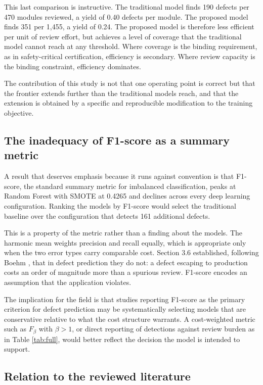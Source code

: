 \documentclass[12pt,a4paper,oneside]{report}
\begin{document}
This last comparison is instructive. The traditional model finds 190 defects per 470 modules reviewed, a yield of 0.40 defects per module. The proposed model finds 351 per 1,455, a yield of 0.24. The proposed model is therefore less efficient per unit of review effort, but achieves a level of coverage that the traditional model cannot reach at any threshold. Where coverage is the binding requirement, as in safety-critical certification, efficiency is secondary. Where review capacity is the binding constraint, efficiency dominates.

The contribution of this study is not that one operating point is correct but that the frontier extends further than the traditional models reach, and that the extension is obtained by a specific and reproducible modification to the training objective.

\subsection{The inadequacy of F1-score as a summary metric}

A result that deserves emphasis because it runs against convention is that F1-score, the standard summary metric for imbalanced classification, peaks at Random Forest with SMOTE at 0.4265 and declines across every deep learning configuration. Ranking the models by F1-score would select the traditional baseline over the configuration that detects 161 additional defects.

This is a property of the metric rather than a finding about the models. The harmonic mean weights precision and recall equally, which is appropriate only when the two error types carry comparable cost. Section 3.6 established, following Boehm \cite{boehm1981}, that in defect prediction they do not: a defect escaping to production costs an order of magnitude more than a spurious review. F1-score encodes an assumption that the application violates.

The implication for the field is that studies reporting F1-score as the primary criterion for defect prediction may be systematically selecting models that are conservative relative to what the cost structure warrants. A cost-weighted metric such as $F_\beta$ with $\beta > 1$, or direct reporting of detections against review burden as in Table \ref{tab:full}, would better reflect the decision the model is intended to support.

\subsection{Relation to the reviewed literature}
\end{document}

